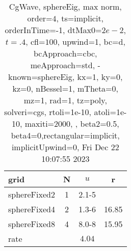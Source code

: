 \begin{table}[H]\tableFont %
\begin{center}
\begin{tabular}{|l|c|c|c|} \hline 
grid  & N &  $ u $ & r \\ \hline 
  sphereFixed2 &     1 & \num{2.1}{-5} &        \\ \hline
  sphereFixed4 &     2 & \num{1.3}{-6} & 16.85  \\ \hline
  sphereFixed8 &     4 & \num{8.0}{-8} & 15.95  \\ \hline
    rate             &       &  $4.04$       &       \\ \hline
\end{tabular}
\caption{CgWave, sphereEig, max norm, order=$4$, ts=implicit, orderInTime=-1, dtMax0=$2e-2$, $t=.4$, cfl=$100$, upwind=1, bc=d, bcApproach=cbc, meApproach=std, -known=sphereEig, kx=1, ky=0, kz=0, nBessel=1, mTheta=0, mz=1, rad=1, tz=poly, solveri=cgs, rtoli=1e-10, atoli=1e-10, maxiti=2000, , beta2=0.5, beta4=0,rectangular=implicit, implicitUpwind=0, Fri Dec 22 10:07:55 2023}\label{table:sphereEigOrder4max}
\end{center}
\end{table}
